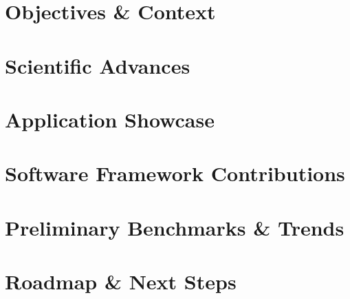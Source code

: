 
\section{Objectives \& Context}

\section{Scientific Advances}

\section{Application Showcase}
%   

\section{Software Framework Contributions}

\section{Preliminary Benchmarks \& Trends}

\section{Roadmap \& Next Steps}
